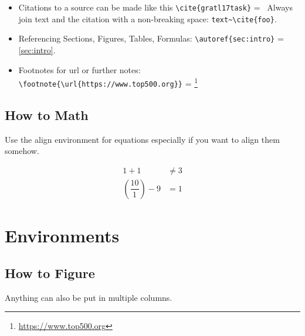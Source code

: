 \begin{itemize}
    \item Citations to a source can be made like this \verb|\cite{gratl17task}| =~\cite{gratl17task}
    \subitem Always join text and the citation with a non-breaking space: \verb|text~\cite{foo}|.
    \item Referencing Sections, Figures, Tables, Formulas: \verb|\autoref{sec:intro}| = \autoref{sec:intro}.
    \item Footnotes for url or further notes: \verb|\footnote{\url{https://www.top500.org}}| = \footnote{\url{https://www.top500.org}}
\end{itemize}

\subsection{How to Math}

Use the align environment for equations especially if you want to align them somehow.

\begin{align}
1 + 1 &\ne 3\\
\left(\dfrac{10}{1}\right) - 9 &= 1
\end{align}

\clearpage

\section{Environments}

\subsection{How to Figure}

Anything can also be put in multiple columns.

